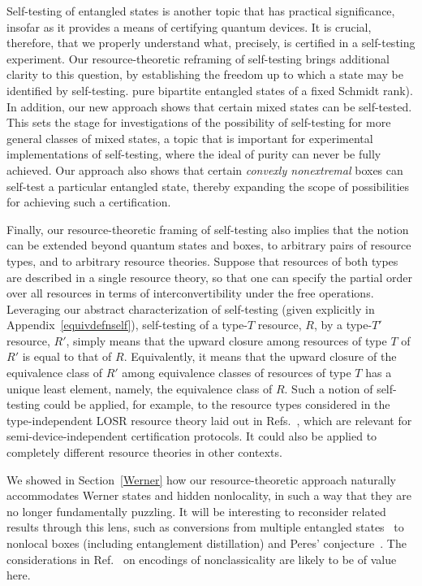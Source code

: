 \documentclass[prx,11pt,letterpaper,twocolumn,accepted=2023-11-27]{quantumarticle}
\theoremstyle{plain}
\theoremstyle{definition}
\begin{document}
Self-testing of entangled states is another topic that has practical significance, insofar as it provides a 
  means of certifying quantum devices. It is crucial, therefore, that we properly understand 
 what, precisely, is certified in a self-testing experiment.
Our resource-theoretic reframing of self-testing brings additional clarity to this
 question, by establishing the freedom up to which a state may be identified by self-testing.
pure bipartite entangled states of a fixed Schmidt rank).
In addition, our new approach shows that certain mixed states can be self-tested.
This sets the stage for investigations of the possibility of self-testing for more general classes of mixed states, a topic that is important for experimental implementations of self-testing, where the ideal of purity can never be fully achieved.
Our approach also shows that certain {\em convexly nonextremal} boxes can self-test a particular entangled state, thereby expanding the scope of possibilities for achieving such a certification.


Finally, our resource-theoretic framing of self-testing also implies that the notion can be extended beyond quantum states and boxes, to arbitrary pairs of resource types,
 and to arbitrary resource theories. Suppose that resources of both types are described in a single resource theory, so that one can specify the partial order over all resources in terms of interconvertibility under the free operations.
Leveraging our abstract characterization of self-testing (given explicitly in Appendix~\ref{equivdefnself}), 
self-testing of a type-$T$ resource, $R$, by a type-$T'$ resource, $R'$, simply means that the upward closure among resources of type $T$ of $R'$  is equal to that of $R$. Equivalently, it means that the upward closure of the equivalence class of $R'$ among equivalence classes of resources of type $T$ has a unique least element, 
 namely, the equivalence class of $R$.
Such a notion of self-testing could be applied, for example, to the resource types
  considered in the type-independent LOSR resource theory laid out in Refs.~\cite{semiquantum,rosset2020characterizing}, which are relevant for semi-device-independent certification protocols. It could also be applied to completely different resource theories in other contexts. 
 
We showed in Section~\ref{Werner} how our resource-theoretic approach naturally accommodates Werner states and hidden nonlocality, in such a way that they are no longer fundamentally puzzling.
It will be interesting to reconsider related results through this lens, such as conversions from multiple entangled states~\cite{BBP+96,Navascues2011,Palazuelos2012} to nonlocal boxes (including entanglement distillation) and Peres' conjecture~\cite{Peres1999,Vertesi2014}. The considerations in Ref.~\cite{semiquantum} on encodings of nonclassicality are likely to be of value here.
 
\end{document}
